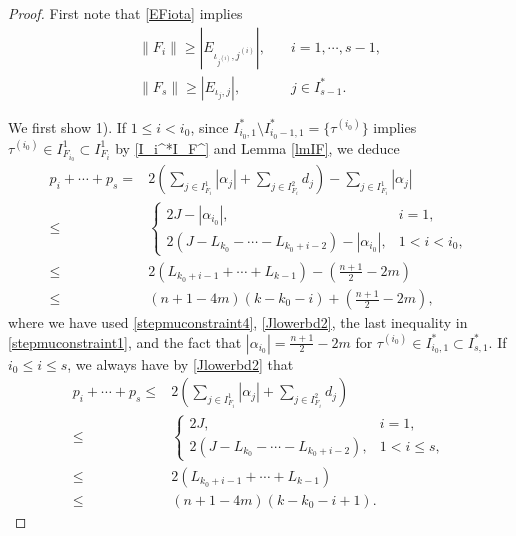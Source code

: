 \documentclass[11pt,reqno]{amsart}
\numberwithin{equation}{section}
\theoremstyle{definition}
\begin{document}
\begin{proof}
	First note that \eqref{EFiota} implies
	\begin{equation}\label{Fj(i)}
		\begin{split}
			\|F_i\|\geq|E_{\iota_{j^{(i)}},j^{(i)}}|,\quad&i=1,\cdots,s-1,\\
			\|F_s\|\geq|E_{\iota_j,j}|,\quad&j\in I_{s-1}^*.
		\end{split}
	\end{equation}
	
	We first show 1). If $1\leq i<i_0$, since $I_{i_0,1}^*\setminus I_{i_0-1,1}^*=\{\tau^{(i_0)}\}$ implies $\tau^{(i_0)}\in I_{F_{i_0}}^1\subset I_{F_i}^1$ by \eqref{I_i^*I_F^} and Lemma \ref{lmIF}, we deduce
	\begin{equation*}
		\begin{split}
			p_i+\cdots+p_s=&2\left(\sum_{j\in I_{F_i}^1}|\alpha_j|+\sum_{j\in I_{F_i}^2}d_j\right)-\sum_{j\in I_{F_i}^1}|\alpha_j|\\
			\leq&\begin{cases}
				2J-|\alpha_{i_0}|,\quad&i=1,\\
				2(J-L_{k_0}-\cdots-L_{k_0+i-2})-|\alpha_{i_0}|,&1<i<i_0,
			\end{cases}\\
			\leq&2(L_{k_0+i-1}+\cdots+L_{k-1})-(\mbox{$\frac{n+1}{2}-2m$})\\
			\leq&(n+1-4m)(k-k_0-i)+(\mbox{$\frac{n+1}{2}-2m$}),
		\end{split}
	\end{equation*}
	where we have used \eqref{stepmuconstraint4}, \eqref{Jlowerbd2}, the last inequality in \eqref{stepmuconstraint1}, and the fact that $|\alpha_{i_0}|=\frac{n+1}{2}-2m$ for $\tau^{(i_0)}\in I_{i_0,1}^*\subset I_{s,1}^*$. If $i_0\leq i\leq s$, we always have by \eqref{Jlowerbd2} that
	\begin{equation}\label{trivialcontrol}
		\begin{split}
			p_i+\cdots+p_s\leq&2\left(\sum_{j\in I_{F_i}^1}|\alpha_j|+\sum_{j\in I_{F_i}^2}d_j\right)\\
			\leq&\begin{cases}
				2J,\quad&i=1,\\
				2(J-L_{k_0}-\cdots-L_{k_0+i-2}),&1<i\leq s,
			\end{cases}\\
			\leq&2(L_{k_0+i-1}+\cdots+L_{k-1})\\
			\leq&(n+1-4m)(k-k_0-i+1).
		\end{split}
	\end{equation}

\end{proof}
\end{document}
